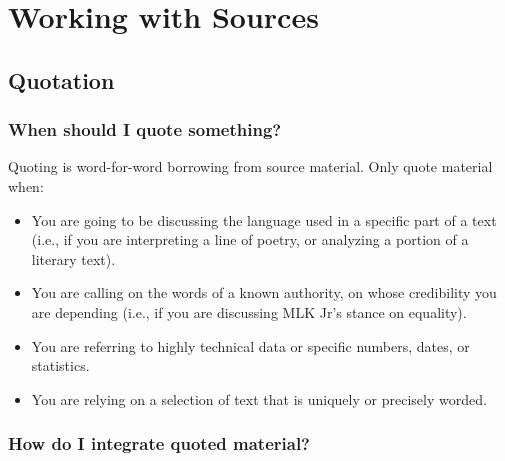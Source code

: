 

\chapter{Working with Sources}
\section{Quotation}
 
\subsection{When should I quote something?}

Quoting is word-for-word borrowing from source material. Only quote material when:
 
\begin{itemize}

\item You are going to be discussing the language used in a specific part of a text (i.e., 
if you are interpreting a line of poetry, or analyzing a portion of a literary text).
 
\item You are calling on the words of a known authority, on whose credibility you are 
depending (i.e., if you are discussing MLK Jr's stance on equality).
 
\item You are referring to highly technical data or specific numbers, dates, or statistics.
 
\item You are relying on a selection of text that is uniquely or precisely worded.
 
 \end{itemize}
 
\subsection{How do I integrate quoted material?}
 
